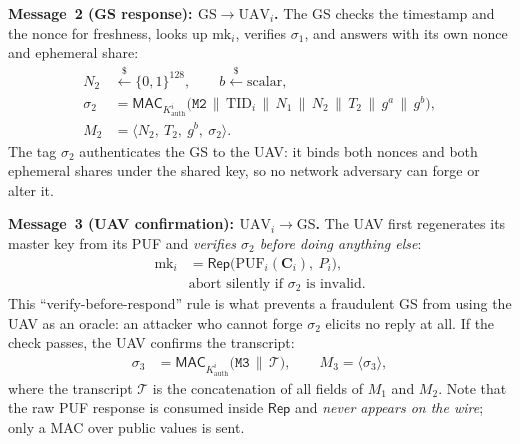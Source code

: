 \documentclass[11pt,a4paper]{article}
\begin{document}
\textbf{Message~2 (GS response): $\text{GS} \rightarrow \text{UAV}_i$.}
The GS checks the timestamp and the nonce for freshness, looks up
$\text{mk}_i$, verifies $\sigma_1$, and answers with its own nonce and
ephemeral share:
\begin{align}
N_2 &\xleftarrow{\$} \{0,1\}^{128}, \qquad b \xleftarrow{\$} \text{scalar}, \\[1ex]
\sigma_2 &= \mathsf{MAC}_{K^{i}_{\text{auth}}}\big(\texttt{M2}\,\|\,\text{TID}_i\,\|\,N_1\,\|\,N_2\,\|\,T_2\,\|\,g^{a}\,\|\,g^{b}\big), \\[1ex]
M_2 &= \langle N_2,\ T_2,\ g^{b},\ \sigma_2 \rangle.
\end{align}
The tag $\sigma_2$ authenticates the GS to the UAV: it binds both nonces and
both ephemeral shares under the shared key, so no network adversary can forge
or alter it.

\textbf{Message~3 (UAV confirmation): $\text{UAV}_i \rightarrow \text{GS}$.}
The UAV first regenerates its master key from its PUF and \emph{verifies
$\sigma_2$ before doing anything else}:
\begin{align}
\text{mk}_i &= \mathsf{Rep}\big(\text{PUF}_i(\bm{C}_i),\ P_i\big), \\[1ex]
&\text{abort silently if } \sigma_2 \text{ is invalid.}
\end{align}
This ``verify-before-respond'' rule is what prevents a fraudulent GS from using
the UAV as an oracle: an attacker who cannot forge $\sigma_2$ elicits no reply
at all. If the check passes, the UAV confirms the transcript:
\begin{align}
\sigma_3 &= \mathsf{MAC}_{K^{i}_{\text{auth}}}\big(\texttt{M3}\,\|\,\mathcal{T}\big), \qquad
M_3 = \langle \sigma_3 \rangle,
\end{align}
where the transcript $\mathcal{T}$ is the concatenation of all fields of $M_1$
and $M_2$. Note that the raw PUF response is consumed inside $\mathsf{Rep}$ and
\emph{never appears on the wire}; only a MAC over public values is sent.
\end{document}
